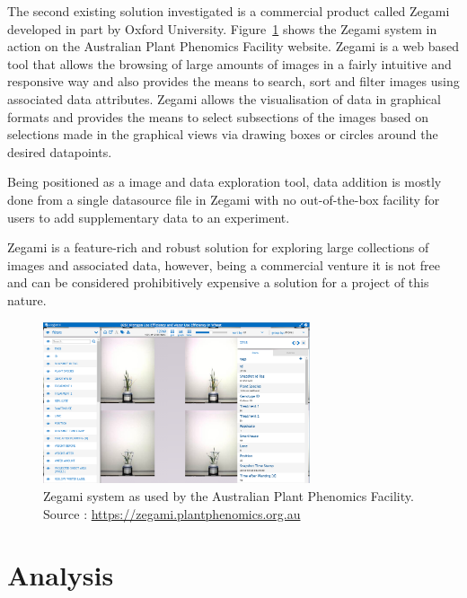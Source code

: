 The second existing solution investigated is a commercial product called Zegami\cite{_Zegami} developed in part by Oxford University. Figure~\ref{fig:zegami} shows the Zegami system in action on the Australian Plant Phenomics Facility\cite{_aus} website. Zegami is a web based tool that allows the browsing of large amounts of images in a fairly intuitive and responsive way and also provides the means to search, sort and filter images using associated data attributes. Zegami allows the visualisation of data in graphical formats and provides the means to select subsections of the images based on selections made in the graphical views via drawing boxes or circles around the desired datapoints.

Being positioned as a image and data exploration tool, data addition is mostly done from a single datasource file in Zegami with no out-of-the-box facility for users to add supplementary data to an experiment.

Zegami is a feature-rich and robust solution for exploring large collections of images and associated data, however, being a commercial venture it is not free and can be considered prohibitively expensive a solution for a project of this nature.


\begin{figure}[H]
    \centering
    \includegraphics[width=0.7\textwidth]{images/background/zegami}
    \caption{Zegami system as used by the Australian Plant Phenomics Facility. Source : \url{https://zegami.plantphenomics.org.au}}
    \label{fig:zegami}
\end{figure}
\section{Analysis}

